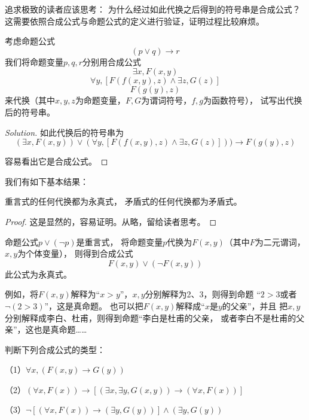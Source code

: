 追求极致的读者应该思考：
为什么经过如此代换之后得到的符号串是合成公式？
这需要依照合成公式与命题公式的定义进行验证，证明过程比较麻烦。

\begin{example}考虑命题公式
$$(p\vee q)\rightarrow r$$
我们将命题变量$p,q,r$分别用合成公式
$$\exists x,F(x,y)$$
$$\forall y,[F(f(x,y),z)\wedge\exists z,G(z)]$$
$$F(g(y),z)$$
来代换（其中$x,y,z$为命题变量，$F,G$为谓词符号，$f,g$为函数符号），
试写出代换后的符号串。
\end{example}

\begin{proof}[Solution]
如此代换后的符号串为
$$(\exists x,F(x,y))\vee (\forall y,[F(f(x,y),z)
\wedge\exists z,G(z)]))\rightarrow F(g(y),z)$$

容易看出它是合成公式。
\end{proof}

我们有如下基本结果：

\begin{thm}重言式的任何代换都为永真式，
矛盾式的任何代换都为矛盾式。
\end{thm}

\begin{proof}
这是显然的，容易证明。从略，留给读者思考。
\end{proof}

\begin{example}命题公式$p\vee(\neg p)$是重言式，
将命题变量$p$代换为$F(x,y)$（其中$F$为二元谓词，$x,y$为个体变量），
则得到合成公式
$$F(x,y)\vee(\neg F(x,y))$$
此公式为永真式。
\end{example}

例如，将$F(x,y)$解释为“$x>y$”，$x,y$分别解释为2、3，则得到命题
“$2>3$或者$\neg(2>3)$”，这是真命题。
也可以把$F(x,y)$解释成“$x$是$y$的父亲”，并且
把$x,y$分别解释成李白、杜甫，则得到命题“李白是杜甫的父亲，
或者李白不是杜甫的父亲”，这也是真命题……

\begin{example}判断下列合成公式的类型：

（1）$\forall x,(F(x,y)\rightarrow G(y))$

（2）$(\forall x,F(x))\rightarrow
[(\exists x,\exists y,G(x,y))\rightarrow(\forall x,F(x))]$

（3）$\neg[(\forall x,F(x))\rightarrow
(\exists y,G(y))]\wedge(\exists y,G(y))$
\end{example}

